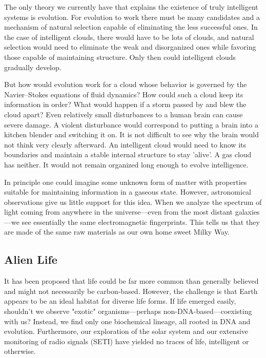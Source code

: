 The only theory we currently have that explains the existence of
truly intelligent systems is evolution. For evolution to work there
must be many candidates and a mechanism of natural selection capable
of eliminating the less successful ones. In the case of intelligent
clouds, there would have to be lots of clouds, and natural selection
would need to eliminate the weak and disorganized ones while favoring
those capable of maintaining structure. Only then could intelligent
clouds gradually develop.

But how would evolution work for a cloud whose behavior is governed
by the Navier--Stokes equations of fluid dynamics? How could such a
cloud keep its information in order? What would happen if a storm
passed by and blew the cloud apart? Even relatively small disturbances to a human brain can cause severe
damage. A violent disturbance would correspond to putting a brain into
a kitchen blender and switching it on. It is not difficult to see why
the brain would not think very clearly afterward.
An intelligent cloud would need to know its boundaries and maintain
a stable internal structure to stay 'alive'. A gas cloud has neither. It would not
remain organized long enough to evolve intelligence.

In principle one could imagine some unknown form of matter with
properties suitable for maintaining information in a gaseous state.
However, astronomical observations give us little support for this
idea. When we analyze the spectrum of light coming from anywhere in
the universe—even from the most distant galaxies—we see essentially
the same electromagnetic fingerprints. This tells us that they are
made of the same raw materials as our own home sweet Milky Way.



\subsection*{Alien Life}

It has been proposed that life could be far more common than generally believed and might not necessarily be carbon-based.
However, the challenge is that Earth appears to be an ideal habitat for diverse life forms.
If life emerged easily, shouldn't we observe "exotic" organisms—perhaps non-DNA-based—coexisting with us? Instead, we find only one biochemical lineage, all rooted in DNA and evolution.
Furthermore, our exploration of the solar system and our extensive monitoring of radio signals (SETI) have yielded no traces of life, intelligent or otherwise.

